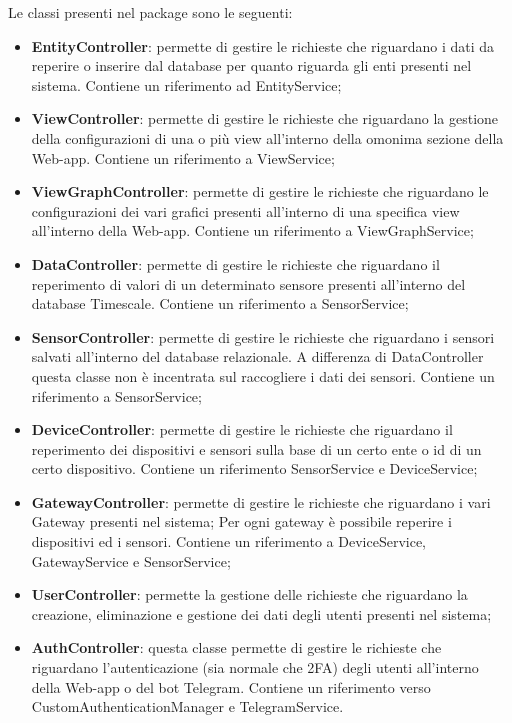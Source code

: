 		Le classi presenti nel package sono le seguenti:
		\begin{itemize}
			\item \textbf{EntityController}: permette di gestire le richieste che riguardano i dati da reperire o inserire dal database per quanto riguarda gli enti presenti nel sistema. Contiene un riferimento ad EntityService;
			\item \textbf{ViewController}: permette di gestire le richieste che riguardano la gestione della configurazioni di una o più view all'interno della omonima sezione della Web-app. Contiene un riferimento a ViewService;
			\item \textbf{ViewGraphController}: permette di gestire le richieste che riguardano le configurazioni dei vari grafici presenti all'interno di una specifica view all'interno della Web-app. Contiene un riferimento a ViewGraphService;
			\item \textbf{DataController}: permette di gestire le richieste che riguardano il reperimento di valori di un determinato sensore presenti all'interno del database Timescale. Contiene un riferimento a SensorService;
			\item \textbf{SensorController}: permette di gestire le richieste che riguardano i sensori salvati all'interno del database relazionale. A differenza di DataController questa classe non è incentrata sul raccogliere i dati dei sensori. Contiene un riferimento a SensorService;
			\item \textbf{DeviceController}: permette di gestire le richieste che riguardano il reperimento dei dispositivi e sensori sulla base di un certo ente o id di un certo dispositivo. Contiene un riferimento SensorService e DeviceService;
			\item \textbf{GatewayController}: permette di gestire le richieste che riguardano i vari Gateway presenti nel sistema; Per ogni gateway è possibile reperire i dispositivi ed i sensori. Contiene un riferimento a DeviceService, GatewayService e SensorService;
			\item \textbf{UserController}: permette la gestione delle richieste che riguardano la creazione, eliminazione e gestione dei dati degli utenti presenti nel sistema; 
			\item \textbf{AuthController}: questa classe permette di gestire le richieste che riguardano l'autenticazione (sia normale che 2FA) degli utenti all'interno della Web-app o del bot Telegram. Contiene un riferimento verso CustomAuthenticationManager e TelegramService.  
		\end{itemize}
